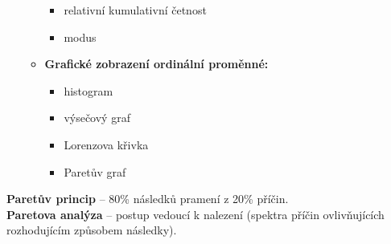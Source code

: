 \begin{enumerate}
\begin{itemize}
\begin{itemize}
                        \item relativní kumulativní četnost
                        \item modus
                    \end{itemize}
              \item \textbf{Grafické zobrazení ordinální proměnné:}
                    \begin{itemize}
                        \item histogram
                        \item výsečový graf
                        \item Lorenzova křivka
                        \item Paretův graf
                    \end{itemize}
          \end{itemize}
\end{enumerate}
\textbf{Paretův princip} – 80\% následků pramení z 20\% příčin.\\
\textbf{Paretova analýza} – postup vedoucí k nalezení  (spektra příčin ovlivňujících rozhodujícím způsobem následky).


